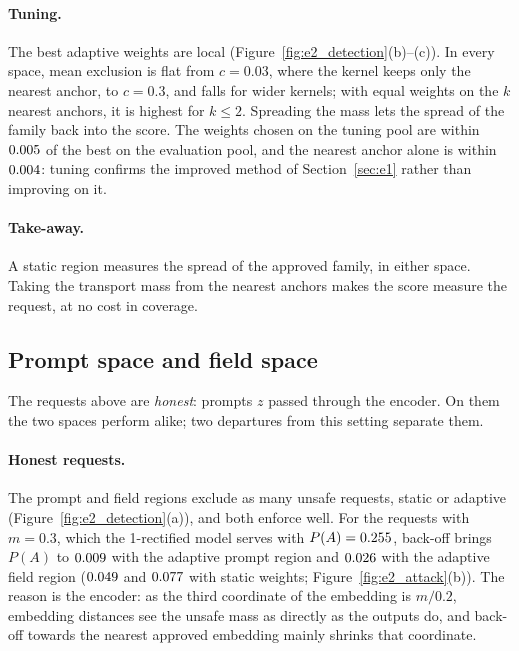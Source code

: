 \documentclass{article}
\theoremstyle{plain}
\theoremstyle{remark}
\begin{document}
\paragraph{Tuning.}
The best adaptive weights are local (Figure~\ref{fig:e2_detection}(b)--(c)). In every space, mean exclusion is flat from $c=0.03$,
where the kernel keeps only the nearest anchor, to $c=0.3$, and falls for wider kernels; with equal weights on the $k$ nearest
anchors, it is highest for $k\le2$. Spreading the mass lets the spread of the family back into the score. The weights chosen on the
tuning pool are within $0.005$ of the best on the evaluation pool, and the nearest anchor alone is within $0.004$: tuning
confirms the improved method of Section~\ref{sec:e1} rather than improving on it.

\paragraph{Take-away.}
A static region measures the spread of the approved family, in either space. Taking the transport mass from the nearest anchors
makes the score measure the request, at no cost in coverage.
\FloatBarrier

\subsection{Prompt space and field space}\label{sec:e2_space}

The requests above are \emph{honest}: prompts $z$ passed through the encoder. On them the two spaces perform alike; two departures
from this setting separate them.

\paragraph{Honest requests.}
The prompt and field regions exclude as many unsafe requests, static or adaptive (Figure~\ref{fig:e2_detection}(a)), and both enforce
well. For the requests with $m=0.3$, which the 1-rectified model serves with $P(A)=0.255$, back-off brings $P(A)$ to $0.009$
with the adaptive prompt region and $0.026$ with the adaptive field region ($0.049$ and $0.077$ with static weights;
Figure~\ref{fig:e2_attack}(b)). The reason is the encoder: as the third coordinate of the embedding is $m/0.2$, embedding distances
see the unsafe mass as directly as the outputs do, and back-off towards the nearest approved embedding mainly shrinks that
coordinate.
\end{document}
